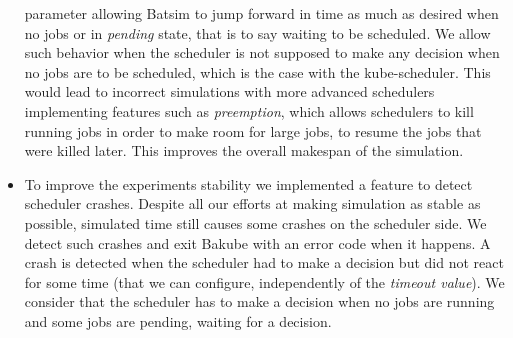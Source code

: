 \begin{itemize}[leftmargin=*]
		parameter allowing Batsim to jump forward in time as much as
		desired when no jobs or in \textit{pending} state, that is to
		say waiting to be scheduled. We allow such behavior when the
		scheduler is not supposed to make any decision when no jobs are
		to be scheduled, which is the case with the kube-scheduler.
		This would lead to incorrect simulations with more advanced
		schedulers implementing features such as \textit{preemption},
		which allows schedulers to kill running jobs in order to make
		room for large jobs, to resume the jobs that were killed later.
		This improves the overall makespan of the simulation.
	\item To improve the experiments stability we implemented a feature to
		detect scheduler crashes. Despite all our efforts at making
		simulation as stable as possible, simulated time still causes
		some crashes on the scheduler side. We detect such crashes and
		exit Bakube with an error code when it happens. A crash is
		detected when the scheduler had to make a decision but did not
		react for some time (that we can configure, independently of
		the \textit{timeout value}). We consider that the scheduler has
		to make a decision when no jobs are running and some jobs are
		pending, waiting for a decision.
\end{itemize}


